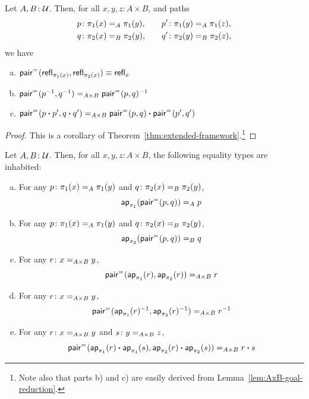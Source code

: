 \begin{prop}\label{prop:product-groupoid-functor}
    Let\/ $A,B\colon\univ$. Then, for all\/ $x,y,z\colon A\times B$, and paths
    \begin{alignat*}{2}
        p&\colon\pi_1(x)\eq A\pi_1(y),\quad& p'&\colon\pi_1(y)\eq A\pi_1(z),\\
        q&\colon\pi_2(x)\eq B\pi_2(y),\quad& q'&\colon\pi_2(y)\eq B\pi_2(z),
    \end{alignat*}
    we have
    \begin{enumerate}[a),font=\upshape]
        \item $\mathsf{pair}^{\mathrel{=_{}}}(\mathsf{refl}_{\pi_1(x)},\mathsf{refl}_{\pi_2(x)})\equiv\mathsf{refl}_x$
        \item $\mathsf{pair}^{\mathrel{=_{}}}(p^{-1},q^{-1})\mathrel{=_{A\times B}}\mathsf{pair}^{\mathrel{=_{}}}(p,q)^{-1}$
        \item $\mathsf{pair}^{\mathrel{=_{}}}(p\mathbin{\boldsymbol{\cdot}} p',q\mathbin{\boldsymbol{\cdot}} q')\mathrel{=_{A\times B}}\mathsf{pair}^{\mathrel{=_{}}}(p,q)\mathbin{\boldsymbol{\cdot}}\mathsf{pair}^{\mathrel{=_{}}}(p',q')$
    \end{enumerate}
\end{prop}

\begin{proof}
    This is a corollary of Theorem~\ref{thm:extended-framework}.\footnote{Note also that parts b) and c) are easily derived from Lemma~\ref{lem:AxB-goal-reduction}.}
\end{proof}
    
\begin{prop}\label{prop:pair-properties}
    Let\/ $A,B\colon\univ$. Then, for all\/ $x,y,z\colon A\times B$, the following equality types are inhabited:
    \begin{enumerate}[a),font=\upshape]
        \item For any\/ $p\colon\pi_1(x)\eq A\pi_1(y)$ and\/ $q\colon\pi_2(x)\eq B\pi_2(y)$,
        \[ \mathsf{ap}_{\pi_1}(\mathsf{pair}^{\mathrel{=_{}}}(p,q))\mathrel{=_{A}} p \]
        
        \item For any\/ $p\colon\pi_1(x)\eq A\pi_1(y)$ and\/ $q\colon\pi_2(x)\eq B\pi_2(y)$,
        \[ \mathsf{ap}_{\pi_2}(\mathsf{pair}^{\mathrel{=_{}}}(p,q))\mathrel{=_{B}} q \]
        
        \item For any\/ $r\colon x\eq{A\times B}y$,
        \[ \mathsf{pair}^{\mathrel{=_{}}}(\mathsf{ap}_{\pi_1}(r), \mathsf{ap}_{\pi_2}(r))\mathrel{=_{A\times B}}r \]
        
        \item For any\/ $r\colon x\eq{A\times B}y$,
        \[ \mathsf{pair}^{\mathrel{=_{}}}(\mathsf{ap}_{\pi_1}(r)^{-1}, \mathsf{ap}_{\pi_2}(r)^{-1})\mathrel{=_{A\times B}}r^{-1} \]
        
        \item For any\/ $r\colon x\eq{A\times B}y$ and\/ $s\colon y\eq{A\times B}z$,
        \[ \mathsf{pair}^{\mathrel{=_{}}}(\mathsf{ap}_{\pi_1}(r)\mathbin{\boldsymbol{\cdot}}\mathsf{ap}_{\pi_1}(s), \mathsf{ap}_{\pi_2}(r)\mathbin{\boldsymbol{\cdot}}\mathsf{ap}_{\pi_2}(s))\mathrel{=_{A\times B}}r\mathbin{\boldsymbol{\cdot}} s \]
    \end{enumerate}
\end{prop}

